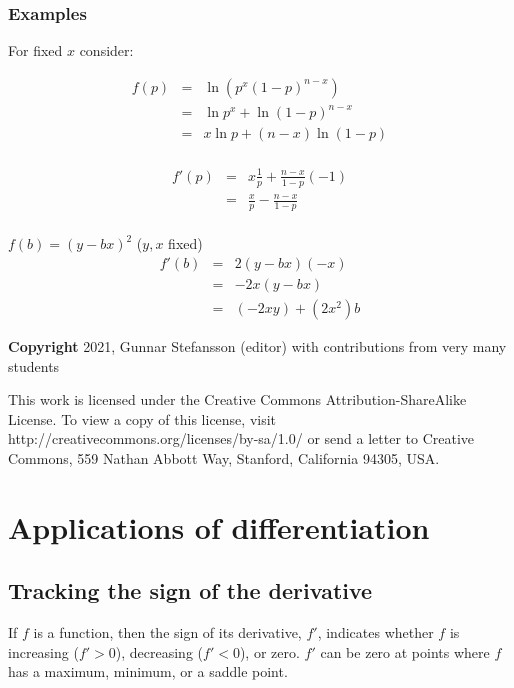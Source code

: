 \documentclass[12pt,a4paper]{article}
\theoremstyle{regla}
\theoremstyle{remark}
\theoremstyle{definition}
\theoremstyle{nonumberbreak}
\begin{document}
\subsubsection{Examples}
\begin{xmpl}
For fixed $x$ consider:
	
	\begin{eqnarray*}
	f(p) &=& \ln(p^{x} (1-p)^{n-x})\\
	     &=& \ln p^{x} + \ln(1-p)^{n-x}\\%
	     &=& x \ln p + (n-x) \ln (1-p)\\
	\end{eqnarray*}
	
	\begin{eqnarray*}
  f'(p)&=& x \frac{1}{p} + \frac{n-x}{1-p}(-1)\\
	     &=& \frac{x}{p} - \frac{n-x}{1-p}\\
	\end{eqnarray*}

\end{xmpl}
\begin{xmpl}	
	$f(b) = (y-bx)^2$ ($y,x$ fixed)\\
	
	\begin{eqnarray*}
	f'(b)&=& 2 (y-bx) (-x)\\
	     &=& -2x (y-bx)\\
	     &=&(-2xy) + (2x^2)b   
	\end{eqnarray*}
\end{xmpl}	
	



{\bf Copyright}
2021, Gunnar Stefansson (editor) with contributions from very many students

This work is licensed under the Creative Commons
Attribution-ShareAlike License. To view a copy of this license, visit
http://creativecommons.org/licenses/by-sa/1.0/ or send a letter to
Creative Commons, 559 Nathan Abbott Way, Stanford, California 94305,
USA.
\clearpage
\section{Applications of differentiation}
\subsection{Tracking the sign of the derivative}
\begin{fbox}
\begin{minipage}{0.97\textwidth}
If $f$ is a function, then the sign of its derivative, $f'$, indicates whether $f$ is increasing ($f'>0$), decreasing ($f'<0$), or zero. $f'$ can be zero at points where $f$ has a maximum, minimum, or a saddle point.

\end{minipage}
\end{fbox}
\end{document}
